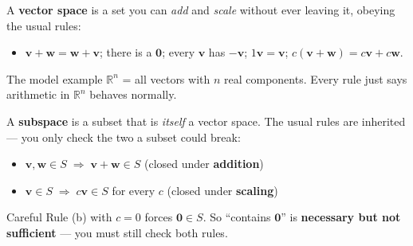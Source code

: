 \documentclass[aspectratio=169, 11pt]{beamer}
\newcommand{\vv}{\mathbf{v}}
\newcommand{\ww}{\mathbf{w}}
\newcommand{\zero}{\mathbf{0}}
\begin{document}
\begin{frame}[t, plain]
  A \textbf{vector space} is a set you can \emph{add} and \emph{scale} without ever leaving it,
  obeying the usual rules:
  \begin{itemize}
    \setlength{\itemsep}{4pt}
    \item $\vv+\ww=\ww+\vv$;\; there is a $\zero$;\; every $\vv$ has $-\vv$;\; $1\vv=\vv$;\; $c(\vv+\ww)=c\vv+c\ww$.
  \end{itemize}
  \vspace{4pt}
  \begin{block}{The model example}
    $\mathbb{R}^n$ = all vectors with $n$ real components. Every rule just says arithmetic in
    $\mathbb{R}^n$ behaves normally.
  \end{block}
\end{frame}

\begin{frame}[t, plain]
  A \textbf{subspace} is a subset that is \emph{itself} a vector space. The usual rules are
  inherited --- you only check the two a subset could break:
  \begin{itemize}
    \setlength{\itemsep}{5pt}
    \item[\textbf{(a)}] $\vv,\ww \in S \;\Rightarrow\; \vv+\ww \in S$ \quad(closed under \textbf{addition})
    \item[\textbf{(b)}] $\vv \in S \;\Rightarrow\; c\vv \in S$ for every $c$ \quad(closed under \textbf{scaling})
  \end{itemize}
  \vspace{4pt}
  \begin{block}{Careful}
    Rule (b) with $c=0$ forces $\zero \in S$. So ``contains $\zero$'' is \textbf{necessary but not
    sufficient} --- you must still check both rules.
  \end{block}
\end{frame}
\end{document}
